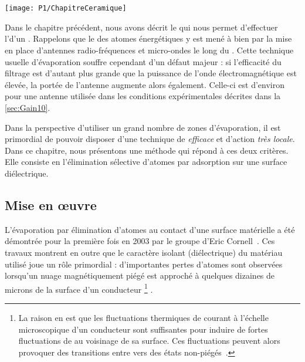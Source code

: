 \chapter{\TitreChapitreDeux}\label{chap:Ceramique}

\bfigh
\texttt{[image: P1/ChapitreCeramique]}
\SansCaption
\efigh

\pagebreak

\minitoc
\vspace{0.5cm}
 
Dans le chapitre précédent, nous avons décrit le \setup qui nous permet d'effectuer l'\evap d'un \jatgm. Rappelons que le \fispse des atomes énergétiques y est mené à bien par la mise en place d'antennes radio-fréquences et micro-ondes le long du \gm. Cette technique usuelle d'évaporation souffre cependant d'un défaut majeur : si l'efficacité du filtrage est d'autant plus grande que la puissance de l'onde électromagnétique est élevée, la portée de l'antenne augmente alors également. Celle-ci est d'environ  pour une antenne \rf utilisée dans les conditions expérimentales décrites dans la \autoref{sec:Gain10}. 

Dans la perspective d'utiliser un grand nombre de zones d'évaporation, il est primordial de pouvoir disposer d'une technique de \fisp \emph{efficace} et d'action \emph{très locale}. 
Dans ce chapitre, nous présentons une méthode qui répond à ces deux critères. Elle consiste en l'élimination sélective d'atomes par adsorption sur une surface diélectrique. 


\section{Mise en \oe uvre}\label{sec:EvapCeramMiseEnOeuvre}
L'évaporation par élimination d'atomes au contact d'une surface matérielle a été démontrée pour la première fois en 2003 par le groupe d'Eric Cornell~\cite{HMO03}. Ces travaux  montrent en outre que le caractère isolant (diélectrique) du matériau utilisé joue un rôle primordial : d'importantes pertes d'atomes sont observées lorsqu'un nuage magnétiquement piégé est approché à quelques dizaines de microns de la surface d'un conducteur%
\footnote{La raison en est que les fluctuations thermiques de courant à l'échelle microscopique d'un conducteur sont suffisantes pour induire de fortes fluctuations de \chm au voisinage de sa surface. Ces fluctuations peuvent alors provoquer des transitions entre \snZ vers des états non-piégés~\cite{HMO03,LTC04}.}%
.

